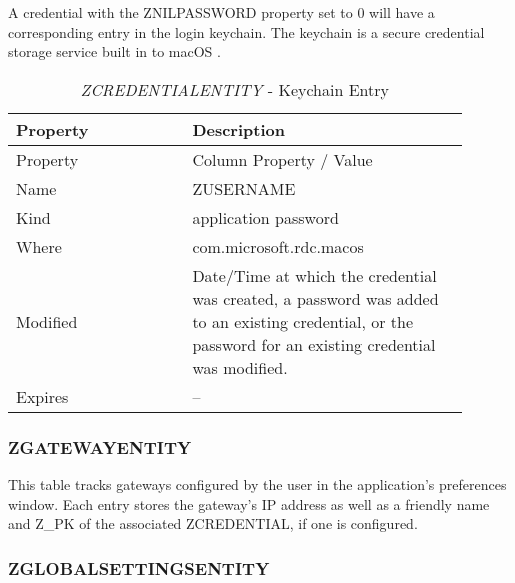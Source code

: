 \documentclass[journal]{IEEEtran}
\begin{document}
A credential with the ZNILPASSWORD property set to 0 will have a corresponding entry in the login keychain. The keychain is a secure credential storage service built in to macOS \cite{noauthor_what_nodate}.

\begin{table}[h!]
\caption{\textit{ZCREDENTIALENTITY} - Keychain Entry}
\begin{tabular}{p{0.35\linewidth} | p{0.55\linewidth}}
Property & Description                                                                                                                                             \\ \hline
Property & Column Property / Value                                                                                                                                 \\
Name     & ZUSERNAME                                                                                                                                               \\
Kind     & application password                                                                                                                                    \\
Where    & com.microsoft.rdc.macos                                                                                                                                 \\
Modified & Date/Time at which the credential was created, a password was added to an existing credential, or the password for an existing credential was modified. \\
Expires  & --                                                                                                                                                     
\end{tabular}
\end{table}

\subsubsection{ZGATEWAYENTITY}

This table tracks gateways configured by the user in the application’s preferences window. Each entry stores the gateway’s IP address as well as a friendly name and Z\_PK of the associated ZCREDENTIAL, if one is configured.\\

\subsubsection{ZGLOBALSETTINGSENTITY}
\end{document}
